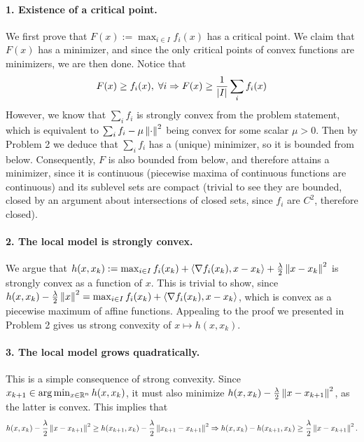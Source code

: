 \documentclass[10pt]{article}
\begin{document}
\begin{Answer}
    \paragraph{1. Existence of a critical point.}
    We first prove that $F(x) := \max_{i \in I} f_i(x)$ has a critical point.
    We claim that $F(x)$ has a minimizer, and since the only critical points of
    convex functions are minimizers, we are then done. Notice that
    \[
        F(x) \geq f_i(x), \; \forall i \Rightarrow
        F(x) \geq \frac{1}{\left| I \right|} \sum_i f_i(x)
    \]
    However, we know that $\sum_i f_i$ is strongly convex from the problem
    statement, which is equivalent to $\sum_i f_i - \mu \left \| \cdot \right \|^2$ being
    convex for some scalar $\mu > 0$. Then by Problem 2 we deduce that $\sum_i
    f_i $ has a (unique) minimizer, so it is bounded from below. Consequently,
    $F$ is also bounded from below, and therefore attains a minimizer, since it
    is continuous (piecewise maxima of continuous functions are continuous) and
    its sublevel sets are compact (trivial to see they are bounded, closed by
    an argument about intersections of closed sets, since $f_i$ are $C^2$,
    therefore closed).

    \paragraph{2. The local model is strongly convex.}
    We argue that $h(x, x_k) := \max_{i \in I} f_i(x_k) + \left\langle \nabla f_i(x_k),
    x - x_k \right\rangle + \frac{\lambda}{2} \left \| x - x_k \right \|^2$ is strongly convex as a
    function of $x$. This is trivial to show, since $h(x, x_k) -
    \frac{\lambda}{2} \left \| x \right \|^2 = \max_{i \in I} f_i(x_k) +
    \left\langle \nabla f_i (x_k), x - x_k \right\rangle$, which is convex as a piecewise maximum of
    affine functions. Appealing to the proof we presented in Problem 2 gives us
    strong convexity of $x \mapsto h(x, x_k)$.

    \paragraph{3. The local model grows quadratically.}
    This is a simple consequence of strong convexity. Since $x_{k+1}
    \in \arg \min_{x \in \mathbb{R}^n} h(x, x_k)$, it must also minimize $h(x, x_k) -
    \frac{\lambda}{2} \left \| x - x_{k+1} \right \|^2$, as the latter is convex. This
    implies that
    \[
        h(x, x_k) - \frac{\lambda}{2} \left \| x - x_{k+1} \right \|^2
        \geq h(x_{k+1}, x_k) - \frac{\lambda}{2} \left \| x_{k+1} - x_{k+1} \right \|^2
        \Rightarrow h(x, x_k) - h(x_{k+1}, x_k) \geq \frac{\lambda}{2}
        \left \| x - x_{k+1} \right \|^2.
    \]

\end{Answer}
\end{document}
